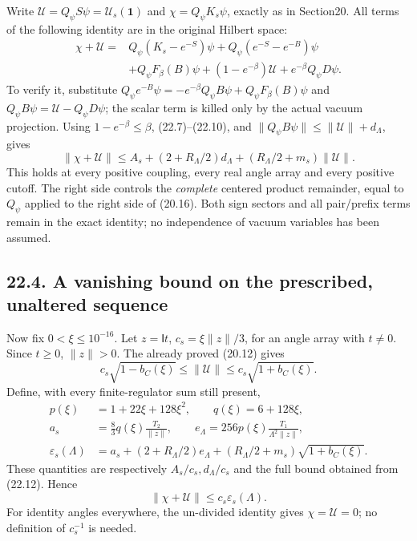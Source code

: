 \documentclass[
]{article}
\begin{document}
Write \(\mathcal U=Q_\psi S\psi=\mathcal U_s(\mathbf1)\) and
\(\chi=Q_\psi K_s\psi\), exactly as in Section20. All terms of the
following identity are in the original Hilbert space: \[
\begin{aligned}
\chi+\mathcal U={}&
 Q_\psi(K_s-e^{-S})\psi+Q_\psi(e^{-S}-e^{-B})\psi\\
 &+Q_\psi F_\beta(B)\psi
 +(1-e^{-\beta})\mathcal U+e^{-\beta}Q_\psi D\psi .
\end{aligned}                                                   \tag{22.11}
\] To verify it, substitute \(Q_\psi e^{-B}\psi=-e^{-\beta}Q_\psi B\psi+
Q_\psi F_\beta(B)\psi\) and \(Q_\psi B\psi=\mathcal U-Q_\psi D\psi\);
the scalar term is killed only by the actual vacuum projection. Using
\(1-e^{-\beta}\le\beta\), (22.7)--(22.10), and
\(\|Q_\psi B\psi\|\le\|\mathcal U\|+d_\Lambda\), gives \[
\boxed{\ 
\|\chi+\mathcal U\|
 \le A_s+(2+R_\Lambda/2)d_\Lambda
                +(R_\Lambda/2+m_s)\|\mathcal U\| .
\ }                                                            \tag{22.12}
\] This holds at every positive coupling, every real angle array and
every positive cutoff. The right side controls the \emph{complete}
centered product remainder, equal to \(Q_\psi\) applied to the right
side of (20.16). Both sign sectors and all pair/prefix terms remain in
the exact identity; no independence of vacuum variables has been
assumed.

\subsection{22.4. A vanishing bound on the prescribed, unaltered
sequence}\label{a-vanishing-bound-on-the-prescribed-unaltered-sequence}

Now fix \(0<\xi\le10^{-16}\). Let \(z=\mathsf It\), \(c_s=\xi\|z\|/3\),
for an angle array with \(t\ne0\). Since \(t\ge0\), \(\|z\|>0\). The
already proved (20.12) gives \[
c_s\sqrt{1-b_C(\xi)}\le\|\mathcal U\|
                  \le c_s\sqrt{1+b_C(\xi)} .
\] Define, with every finite-regulator sum still present, \[
\begin{aligned}
p(\xi)&=1+22\xi+128\xi^2,\qquad q(\xi)=6+128\xi,\\
a_s&=\frac83q(\xi)\frac{T_2}{\|z\|},\qquad
e_\Lambda=256p(\xi)\frac{T_1}{\Lambda^2\|z\|},\\
\varepsilon_s(\Lambda)&=
a_s+(2+R_\Lambda/2)e_\Lambda
          +(R_\Lambda/2+m_s)\sqrt{1+b_C(\xi)} .
\end{aligned}                                                   \tag{22.13}
\] These quantities are respectively \(A_s/c_s,d_\Lambda/c_s\) and the
full bound obtained from (22.12). Hence \[
\|\chi+\mathcal U\|\le c_s\varepsilon_s(\Lambda).
                                                               \tag{22.14}
\] For identity angles everywhere, the un-divided identity gives
\(\chi=\mathcal U=0\); no definition of \(c_s^{-1}\) is needed.
\end{document}
